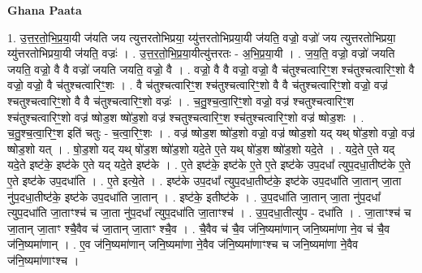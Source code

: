 \documentclass[17pt]{extarticle}
\begin{document}
\textbf{Ghana Paata } \newline

1. उ॒त्त॒र॒तो॒भि॒प्र॒या॒यी ज॑यति जय त्युत्तरतोभिप्रया॒ य्यु॑त्तरतोभिप्रया॒यी ज॑यति॒ वज्रो॒ वज्रो॑ जय
त्युत्तरतोभिप्रया॒ य्यु॑त्तरतोभिप्रया॒यी ज॑यति॒ वज्रः॑ । . उ॒त्त॒र॒तो॒भि॒प्र॒या॒यीत्यु॑त्तरतः - अ॒भि॒प्र॒या॒यी । . ज॒य॒ति॒ वज्रो॒ वज्रो॑ जयति जयति॒ वज्रो॒ वै वै वज्रो॑ जयति जयति॒ वज्रो॒ वै । . वज्रो॒ वै वै वज्रो॒ वज्रो॒ वै च॑तुश्चत्वारिꣳ॒॒श श्च॑तुश्चत्वारिꣳ॒॒शो वै वज्रो॒ वज्रो॒ वै च॑तुश्चत्वारिꣳ॒॒शः । . वै च॑तुश्चत्वारिꣳ॒॒श श्च॑तुश्चत्वारिꣳ॒॒शो वै वै च॑तुश्चत्वारिꣳ॒॒शो वज्रो॒ वज्र॑ श्चतुश्चत्वारिꣳ॒॒शो वै वै च॑तुश्चत्वारिꣳ॒॒शो वज्रः॑ । . च॒तु॒श्च॒त्वा॒रिꣳ॒॒शो वज्रो॒ वज्र॑ श्चतुश्चत्वारिꣳ॒॒श श्च॑तुश्चत्वारिꣳ॒॒शो वज्र॑ ष्षोड॒श ष्षो॑ड॒शो वज्र॑ श्चतुश्चत्वारिꣳ॒॒श श्च॑तुश्चत्वारिꣳ॒॒शो वज्र॑ ष्षोड॒शः । . च॒तु॒श्च॒त्वा॒रिꣳ॒॒श इति॑ चतुः - च॒त्वा॒रिꣳ॒॒शः । . वज्र॑ ष्षोड॒श ष्षो॑ड॒शो वज्रो॒ वज्र॑ ष्षोड॒शो यद् यथ् षो॑ड॒शो वज्रो॒ वज्र॑ ष्षोड॒शो यत् । . षो॒ड॒शो यद् यथ् षो॑ड॒श ष्षो॑ड॒शो यदे॒ते ए॒ते यथ् षो॑ड॒श ष्षो॑ड॒शो यदे॒ते । . यदे॒ते ए॒ते यद् यदे॒ते इष्ट॑के॒ इष्ट॑के ए॒ते यद् यदे॒ते इष्ट॑के । . ए॒ते इष्ट॑के॒ इष्ट॑के ए॒ते ए॒ते इष्ट॑के उप॒दधा᳚ त्युप॒दधा॒तीष्ट॑के ए॒ते ए॒ते इष्ट॑के उप॒दधा॑ति । . ए॒ते इत्ये॒ते । . इष्ट॑के उप॒दधा᳚ त्युप॒दधा॒तीष्ट॑के॒ इष्ट॑के उप॒दधा॑ति जा॒तान् जा॒ता नु॑प॒दधा॒तीष्ट॑के॒ इष्ट॑के उप॒दधा॑ति जा॒तान् । . इष्ट॑के॒ इतीष्ट॑के । . उ॒प॒दधा॑ति जा॒तान् जा॒ता नु॑प॒दधा᳚ त्युप॒दधा॑ति जा॒ताꣳश्च॑ च जा॒ता नु॑प॒दधा᳚ त्युप॒दधा॑ति जा॒ताꣳश्च॑ । . उ॒प॒दधा॒तीत्यु॑प - दधा॑ति । . जा॒ताꣳश्च॑ च जा॒तान् जा॒ताꣳ श्चै॒वैव च॑ जा॒तान् जा॒ताꣳ श्चै॒व । . चै॒वैव च॑ चै॒व ज॑नि॒ष्यमा॑णान् जनि॒ष्यमा॑णा ने॒व च॑ चै॒व ज॑नि॒ष्यमा॑णान् । . ए॒व ज॑नि॒ष्यमा॑णान् जनि॒ष्यमा॑णा ने॒वैव ज॑नि॒ष्यमा॑णाꣳश्च च जनि॒ष्यमा॑णा ने॒वैव ज॑नि॒ष्यमा॑णाꣳश्च । \newline
\end{document}
